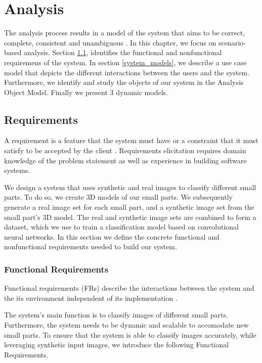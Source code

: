 \chapter{Analysis}\label{ch:analysis}

The analysis process results in a model of the system that aims to be correct, complete, consistent and unambiguous \cite{bruegge2004object}. In this chapter, we focus on scenario-based analysis. Section \ref{requirements}, identifies the functional and nonfunctional requiremens of the system. In section \ref{system_models}, we describe a use case model that depicts the different interactions between the users and the system. Furthermore, we identify and study the objects of our system in the Analysis Object Model. Finally we present 3 dynamic models.


\section{Requirements}\label{requirements}

A requirement is a feature that the system must have or a constraint that it must satisfy to be accepted by the client \cite{bruegge2004object}. Requirements elicitation requires domain knowledge of the problem statement as well as experience in building software systems.

We design a system that uses synthetic and real images to classify different small parts. To do so, we create 3D models of our small parts. We subsequently generate a real image set for each small part, and a synthetic image set from the small part's 3D model. The real and synthetic image sets are combined to form a dataset, which we use to train a classification model based on convolutional neural networks. In this section we define the concrete functional and nonfunctional requirements needed to build our system.

\subsection{Functional Requirements}
Functional requirements (FRs) describe the interactions between the system and the its environment independent of its implementation \cite{bruegge2004object}.

The system's main function is to classify images of different small parts. Furthermore, the system needs to be dynamic and scalable to accomodate new small parts. To ensure that the system is able to classify images accurately, while leveraging synthetic input images, we introduce the following Functional Requirements.

